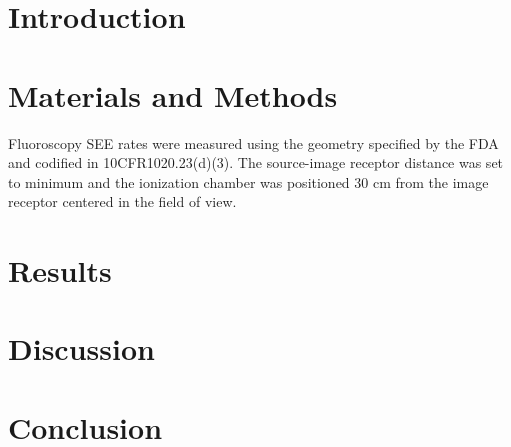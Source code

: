 \documentclass[aps,showpacs,showkeys,preprint,amsmath,amssymb]{revtex4}
\begin{document}
\keywords{}

\maketitle

\section{Introduction}
\label{sec:Introduction}


\section{Materials and Methods}
\label{sec:MatMethods}
Fluoroscopy SEE rates were measured using the geometry specified by the FDA and codified in 10CFR1020.23(d)(3). The source-image receptor distance was set to minimum and the ionization chamber was positioned 30 cm from the image receptor centered in the field of view.

\section{Results}
\label{sec:Results}


\section{Discussion}
\label{sec:Discussion}

\section{Conclusion}
\label{sec:Conclusion}





\end{document}
